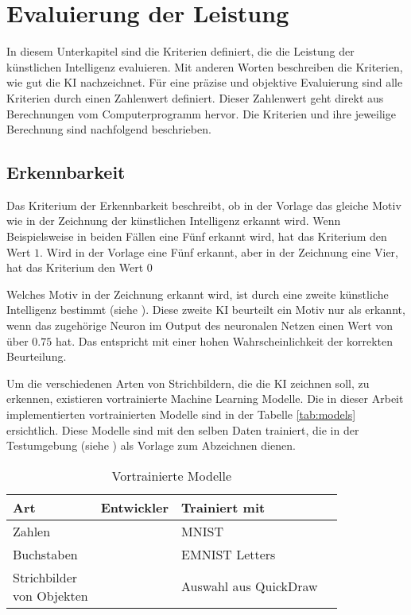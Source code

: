 \section{Evaluierung der Leistung}\label{chap:m_eval}
In diesem Unterkapitel sind die Kriterien definiert, die die Leistung der
künstlichen Intelligenz evaluieren. Mit anderen Worten beschreiben die
Kriterien, wie gut die KI nachzeichnet. Für eine präzise und objektive
Evaluierung sind alle Kriterien durch einen Zahlenwert definiert. Dieser
Zahlenwert geht direkt aus Berechnungen vom Computerprogramm hervor. Die
Kriterien und ihre jeweilige Berechnung sind nachfolgend beschrieben.

\subsection{Erkennbarkeit}\label{sub:m_eval_rec}
Das Kriterium der Erkennbarkeit beschreibt, ob in der Vorlage das gleiche Motiv
wie in der Zeichnung der künstlichen Intelligenz erkannt wird. Wenn
Beispielsweise in beiden Fällen eine Fünf erkannt wird, hat das Kriterium den
Wert $1$. Wird in der Vorlage eine Fünf erkannt, aber in der Zeichnung eine
Vier, hat das Kriterium den Wert $0$

Welches Motiv in der Zeichnung erkannt wird, ist durch eine zweite künstliche
Intelligenz bestimmt (siehe ). Diese zweite KI beurteilt
ein Motiv nur als erkannt, wenn das zugehörige Neuron im Output des neuronalen
Netzen einen Wert von über $0.75$ hat. Das entspricht mit einer hohen
Wahrscheinlichkeit der korrekten Beurteilung.

Um die verschiedenen Arten von Strichbildern, die die KI zeichnen soll, zu
erkennen, existieren vortrainierte Machine Learning Modelle. Die in dieser
Arbeit implementierten vortrainierten Modelle sind in der Tabelle \autoref{tab:models}
ersichtlich. Diese Modelle sind mit den selben Daten trainiert, die in der
Testumgebung (siehe ) als Vorlage zum Abzeichnen
dienen.

\begin{table}[!ht]
  \centering
  \begin{tabular}{|l|l|l|l|}
  \hline
      Art & Entwickler & Trainiert mit \\ \hline
      Zahlen & \cite{mazzia__2022} & MNIST \\ \hline
      Buchstaben & \cite{mor_emnist_2022} & EMNIST Letters \\ \hline
      \makecell{Strichbilder\\von Objekten} & \cite{lam_linus_keras_2022} & Auswahl aus QuickDraw \\ \hline
  \end{tabular}
  \caption{Vortrainierte Modelle}
  \label{tab:models}
\end{table}

